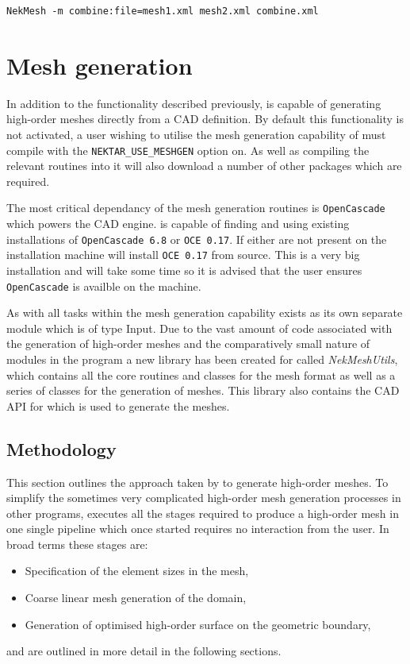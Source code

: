 \begin{lstlisting}[style=BashInputStyle]
  NekMesh -m combine:file=mesh1.xml mesh2.xml combine.xml
\end{lstlisting}

\section{Mesh generation}

In addition to the functionality described previously, \nm is capable of
generating high-order meshes directly from a CAD definition. By default this
functionality is not activated, a user wishing to utilise the mesh generation
capability of \nm must compile \nekpp with the \texttt{NEKTAR\_USE\_MESHGEN}
option on. As well as compiling the relevant routines into \nm it will also
download a number of other packages which are required.

The most critical dependancy of the mesh generation routines is
\texttt{OpenCascade} which powers the CAD engine. \nm is capable of finding and
using existing installations of \texttt{OpenCascade 6.8} or \texttt{OCE 0.17}.
If either are not present on the installation machine \nm will install
\texttt{OCE 0.17} from source. This is a very big installation and will take
some time so it is advised that the user ensures \texttt{OpenCascade} is
availble on the machine.

As with all tasks within \nm the mesh generation capability exists as its
own separate module which is of type Input. Due to the vast amount of code
associated with the generation of high-order meshes and the comparatively small
nature of modules in the \nm program a new library has been created for \nekpp
called {\em NekMeshUtils}, which contains all the core routines and classes for
the \nm mesh format as well as a series of classes for the generation of meshes.
This library also contains the CAD API for \nekpp which is used to generate the
meshes.

\subsection{Methodology}

This section outlines the approach taken by \nm to generate high-order meshes.
%
To simplify the sometimes very complicated high-order mesh generation processes
in other programs, \nm executes all the stages required to produce a high-order
mesh in one single pipeline which once started requires no interaction from the
user. In broad terms these stages are:
\begin{itemize}
	\item Specification of the element sizes in the mesh,
	\item Coarse linear mesh generation of the domain,
	\item Generation of optimised high-order surface on the geometric boundary,
\end{itemize}
%
and are outlined in more detail in the following sections.

